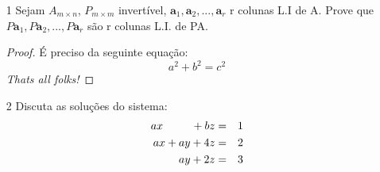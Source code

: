 \documentclass[11pt]{article}
\begin{document}
\begin{itemize}
\item[1] Sejam $A_{m \times n}$, $P_{m \times m}$ invertível, $\textbf{a}_1, \textbf{a}_2, ..., \textbf{a}_r$ r colunas L.I de A. Prove que $P\textbf{a}_1,P\textbf{a}_2,...,P\textbf{a}_r$ são r colunas L.I. de PA.
\begin{proof}
É preciso da seguinte equação:
\[
a^2 + b^2 = c^2
\]
\textit{Thats all folks!} \qedhere
\end{proof}

\item[2] Discuta as soluções do sistema:
\begin{eqnarray*} 
ax \hspace{9mm} +bz &=&1\\
ax+ay+4z&=&2\\
ay+2z&=&3 
\end{eqnarray*}
\end{itemize}

%
%
%
%
%
%
%
%
%
%
%
%
								
\end{document}

